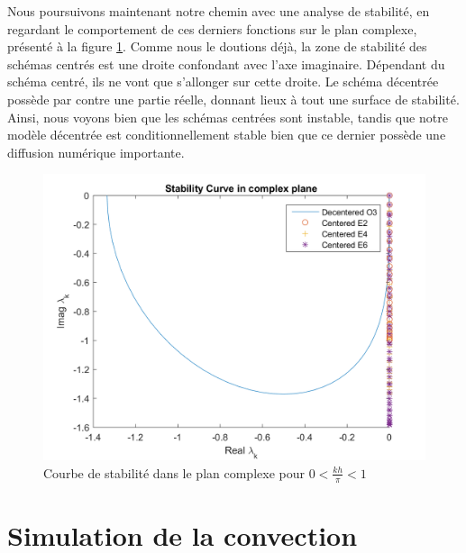 \documentclass{article}
\begin{document}
Nous poursuivons maintenant notre chemin avec une analyse de stabilité, en regardant le comportement de ces derniers fonctions sur le plan complexe, présenté à la figure \ref{fig2}. Comme nous le doutions déjà, la zone de stabilité des schémas centrés est une droite confondant avec l'axe imaginaire. Dépendant du schéma centré, ils ne vont que s'allonger sur cette droite. Le schéma décentrée possède par contre une partie réelle, donnant lieux à tout une surface de stabilité. Ainsi, nous voyons bien que les schémas centrées sont instable, tandis que notre modèle décentrée est conditionnellement stable bien que ce dernier possède une diffusion numérique importante.  \\
\begin{figure}[H]
    \centering
    \includegraphics[scale=0.5]{img/fig2.png}
    \caption{Courbe de stabilité dans le plan complexe pour $0 < \frac{kh}{\pi} < 1$}
    \label{fig2}
\end{figure}

\newpage
\section{Simulation de la convection}
\end{document}
